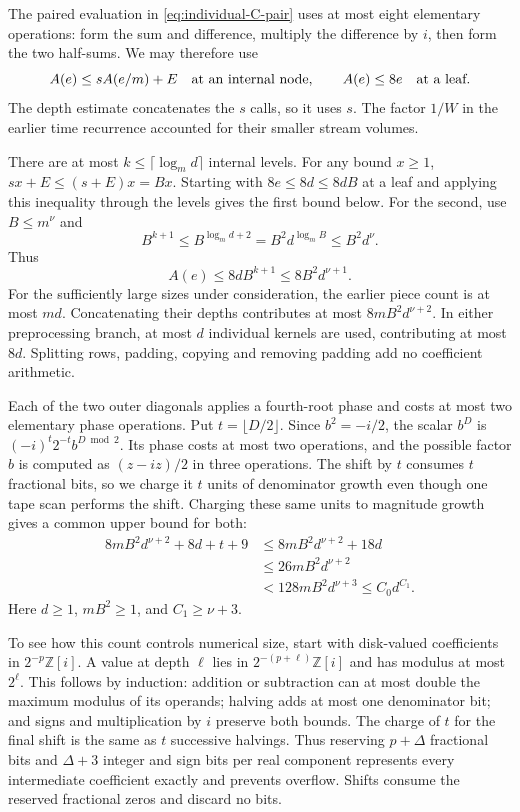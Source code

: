 The paired evaluation in \eqref{eq:individual-C-pair} uses at most
eight elementary operations: form the sum and difference, multiply
the difference by \(i\), then form the two half-sums.  We may therefore use
\[
 A(e)\le sA(e/m)+E
 \quad\hbox{at an internal node},\qquad A(e)\le8e
 \quad\hbox{at a leaf}.
\]
The depth estimate concatenates the \(s\) calls, so it uses \(s\).
The factor \(1/W\) in the earlier time recurrence accounted for
their smaller stream volumes.

There are at most \(k\le\lceil\log_m d\rceil\) internal levels.
For any bound \(x\ge1\), \(sx+E\le(s+E)x=Bx\).
Starting with \(8e\le8d\le8dB\) at a leaf and applying this
inequality through the levels gives the first bound below.
For the second, use \(B\le m^\nu\) and
\[
 B^{k+1}\le B^{\log_m d+2}
          =B^2d^{\log_m B}\le B^2d^\nu.
\]
Thus
\[
 A(e)\le 8dB^{k+1}\le8B^2d^{\nu+1}.
\]
For the sufficiently large sizes under consideration, the earlier
piece count is at most \(md\).  Concatenating their depths contributes
at most \(8mB^2d^{\nu+2}\).  In either preprocessing branch, at most
\(d\) individual kernels are used, contributing at most \(8d\).
Splitting rows, padding, copying and removing padding add no
coefficient arithmetic.

Each of the two outer diagonals applies a fourth-root phase and costs
at most two elementary phase operations.  Put
\(t=\lfloor D/2\rfloor\).  Since \(b^2=-i/2\), the scalar \(b^D\)
is \((-i)^t2^{-t}b^{D\bmod2}\).  Its phase costs at most two
operations, and the possible factor \(b\) is computed as
\((z-iz)/2\) in three operations.  The shift by \(t\) consumes
\(t\) fractional bits, so we charge it \(t\) units of denominator
growth even though one tape scan performs the shift.  Charging these
same units to magnitude growth gives a common upper bound for both:
\[
\begin{aligned}
 8mB^2d^{\nu+2}+8d+t+9
 &\le 8mB^2d^{\nu+2}+18d\\
 &\le 26mB^2d^{\nu+2}\\
 &<128mB^2d^{\nu+3}\le C_0d^{C_1}.
\end{aligned}
\]
Here \(d\ge1\), \(mB^2\ge1\), and \(C_1\ge\nu+3\).

To see how this count controls numerical size, start with disk-valued
coefficients in \(2^{-p}\mathbb Z[i]\).  A value at depth \(\ell\)
lies in \(2^{-(p+\ell)}\mathbb Z[i]\) and has modulus at most
\(2^\ell\).  This follows by induction: addition or subtraction
can at most double the maximum modulus of its operands; halving adds
at most one denominator bit; and signs and multiplication by \(i\)
preserve both bounds.  The charge of \(t\) for the final shift is
the same as \(t\) successive halvings.  Thus reserving \(p+\Delta\)
fractional bits and \(\Delta+3\) integer and sign bits per real
component represents every intermediate coefficient exactly and
prevents overflow.  Shifts consume the reserved fractional zeros
and discard no bits.

